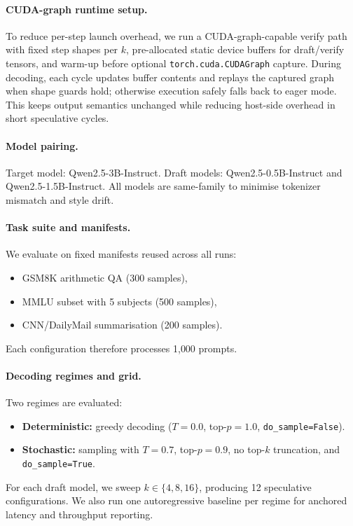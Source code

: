 \paragraph{CUDA-graph runtime setup.}
To reduce per-step launch overhead, we run a CUDA-graph-capable verify path
with fixed step shapes per $k$, pre-allocated static device buffers for
draft/verify tensors, and warm-up before optional
\texttt{torch.cuda.CUDAGraph} capture. During decoding, each cycle updates
buffer contents and replays the captured graph when shape guards hold;
otherwise execution safely falls back to eager mode. This keeps output
semantics unchanged while reducing host-side overhead in short speculative
cycles.

\paragraph{Model pairing.}
Target model: Qwen2.5-3B-Instruct.
Draft models: Qwen2.5-0.5B-Instruct and Qwen2.5-1.5B-Instruct.
All models are same-family to minimise tokenizer mismatch and style drift.

\paragraph{Task suite and manifests.}
We evaluate on fixed manifests reused across all runs:
\begin{itemize}
    \item GSM8K arithmetic QA (300 samples),
    \item MMLU subset with 5 subjects (500 samples),
    \item CNN/DailyMail summarisation (200 samples).
\end{itemize}
Each configuration therefore processes 1{,}000 prompts.

\paragraph{Decoding regimes and grid.}
Two regimes are evaluated:
\begin{itemize}
    \item \textbf{Deterministic:} greedy decoding ($T{=}0.0$, top-$p{=}1.0$, \texttt{do\_sample=False}).
    \item \textbf{Stochastic:} sampling with $T{=}0.7$, top-$p{=}0.9$, no top-$k$ truncation, and \texttt{do\_sample=True}.
\end{itemize}
For each draft model, we sweep $k\in\{4,8,16\}$, producing
12 speculative configurations. We also run one autoregressive baseline per
regime for anchored latency and throughput reporting.

